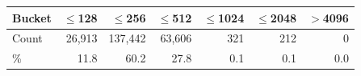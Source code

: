 \begin{tabular}{@{}lrrrrrr@{}}
\toprule
\textbf{Bucket} & \textbf{$\leq$128} & \textbf{$\leq$256} & \textbf{$\leq$512} & \textbf{$\leq$1024} & \textbf{$\leq$2048} & \textbf{$>$4096} \\
\midrule
Count   & 26{,}913 & 137{,}442 & 63{,}606 & 321 & 212 & 0 \\
\%      & 11.8     & 60.2      & 27.8     & 0.1 & 0.1 & 0.0 \\
\bottomrule
\end{tabular}
